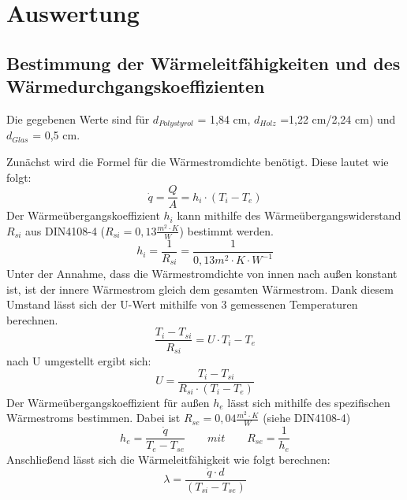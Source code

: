 \section{Auswertung}
\subsection{Bestimmung der Wärmeleitfähigkeiten und des Wärmedurchgangskoeffizienten}
Die gegebenen Werte sind für $d_{Polystyrol}$ = 1,84 cm, $d_{Holz}$ =1,22 cm/2,24 cm) und $d_{Glas}$ = 0,5 cm.

Zunächst wird die Formel für die Wärmestromdichte benötigt. Diese lautet wie folgt:
\begin{equation}
\dot q=\frac{ Q }{ A }=h_{ i }\cdot(T_{ i }-T_{e})
  \label{eq:230514_Wärmestromdichte}
\end{equation}
Der Wärmeübergangskoeffizient $h_{i}$ kann mithilfe des Wärmeübergangswiderstand $R_{si}$ aus DIN4108-4 ($R_{si}=0,13 \frac{m^2 \cdot K}{W} $) bestimmt werden.
\begin{equation}
h_{i}=\frac{ 1 }{ R_{ si } }=\frac{ 1 }{ 0,13m^2\cdot K \cdot W^{-1} }
  \label{eq:230514_Wärmeübergangskoeffizient}
\end{equation}
Unter der Annahme, dass die Wärmestromdichte von innen nach außen konstant ist, ist der innere Wärmestrom gleich dem gesamten Wärmestrom. Dank diesem Umstand lässt sich der U-Wert mithilfe von 3 gemessenen Temperaturen berechnen.
\begin{equation}
\frac{ T_{i} - T_{si}}{ R_{ si } }=U \cdot T_{i} - T_{e}
  \label{eq:230514_u1}
\end{equation}
nach U umgestellt ergibt sich: 
\begin{equation}
U = \frac{ T_{i} - T_{si}}{ R_{ si } \cdot  (T_{i} - T_{e})}
  \label{eq:230514_u2}
\end{equation}
Der Wärmeübergangskoeffizient für außen $h_{e}$ lässt sich mithilfe des spezifischen Wärmestroms bestimmen. Dabei ist $R_{se}=0,04 \frac{ m^2 \cdot K }{W}$ (siehe DIN4108-4)
\begin{equation}
h_{e}=\frac{ \dot q }{ T_{e} - T_{se} }   \qquad  mit     \qquad       R_{se}=\frac{ 1 }{ h_{e} }
  \label{eq:230514_h_e}
\end{equation}
Anschließend lässt sich die Wärmeleitfähigkeit wie folgt berechnen:
\begin{equation}
\lambda=\frac{ \dot q \cdot d }{  ( T_{si} - T_{se} )}
  \label{eq:230514_lamda}
\end{equation}

